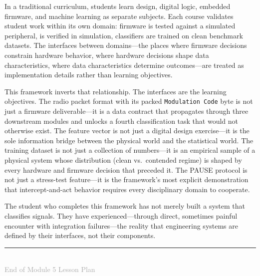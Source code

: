\documentclass[11pt,letterpaper]{article}
\begin{document}
	\begin{tcolorbox}[infobox={Why Cross-Domain Integration Is the Subject---Not the Obstacle}]
		In a traditional curriculum, students learn \RF{} design, digital logic, embedded firmware, and machine learning as separate subjects. Each course validates student work within its own domain: firmware is tested against a simulated peripheral, \VHDL{} is verified in simulation, classifiers are trained on clean benchmark datasets. The interfaces between domains---the places where firmware decisions constrain hardware behavior, where hardware decisions shape data characteristics, where data characteristics determine \ML{} outcomes---are treated as implementation details rather than learning objectives.

		This framework inverts that relationship. The interfaces are the learning objectives. The radio packet format with its packed \texttt{Modulation Code} byte is not just a firmware deliverable---it is a data contract that propagates through three downstream modules and unlocks a fourth classification task that would not otherwise exist. The \FPGA{} feature vector is not just a digital design exercise---it is the sole information bridge between the physical \RF{} world and the statistical \ML{} world. The training dataset is not just a collection of numbers---it is an empirical sample of a physical system whose distribution (clean vs.\ contended regime) is shaped by every hardware and firmware decision that preceded it. The PAUSE protocol is not just a stress-test feature---it is the framework's most explicit demonstration that intercept-and-act behavior requires every disciplinary domain to cooperate.

		The student who completes this framework has not merely built a system that classifies \RF{} signals. They have experienced---through direct, sometimes painful encounter with integration failures---the reality that engineering systems are defined by their interfaces, not their components.
	\end{tcolorbox}

	\vfill
	\clearpage
	\printnoidxglossary[type=\acronymtype,title={Glossary}]

	\begin{center}
		\rule{0.5\textwidth}{0.4pt}\\[6pt]
		{\small\textcolor{darkgray}{End of Module 5 Lesson Plan}}
	\end{center}
\end{document}
